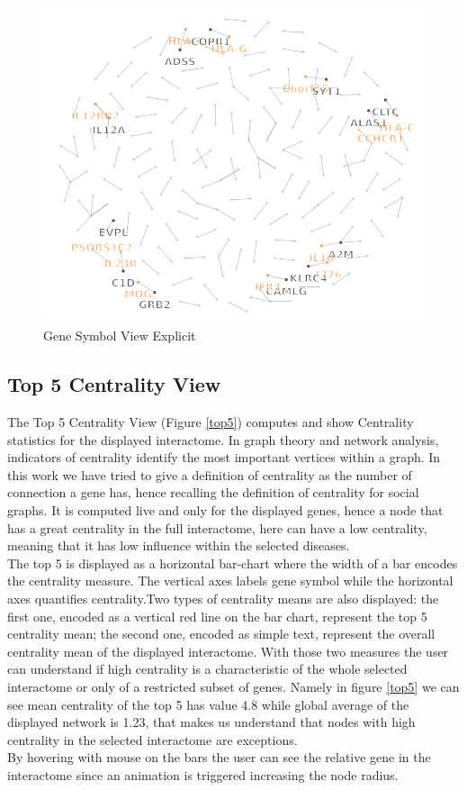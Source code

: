 \documentclass[12pt,twocolumn,twoside]{article}
\begin{document}
\begin{figure}
	\includegraphics[width=.95\linewidth]{net2.png}
	\caption{Gene Symbol View Explicit}
	\label{net2}
\end{figure}


\subsection*{Top 5 Centrality View}
The Top 5 Centrality View (Figure \ref{top5}) computes and show Centrality statistics for the displayed interactome. In graph theory and network analysis, indicators of centrality identify the most important vertices within a graph.  In this work we have tried to give a definition of centrality as the number of connection a gene has, hence recalling the definition of centrality for social graphs. It is computed live and only for the displayed genes, hence a node that has a great centrality in the full interactome, here can have a low centrality, meaning that it has low influence within the selected diseases. \\ The top 5 is displayed as a horizontal bar-chart where the width of a bar encodes the centrality measure. The vertical axes labels gene symbol while the horizontal axes quantifies centrality.\newline Two types of centrality means are also displayed: the first one, encoded as a vertical red line on the bar chart, represent the top 5 centrality mean; the second one, encoded as simple text, represent the overall centrality mean of the displayed interactome. With those two measures the user can understand if high centrality is a characteristic of the whole selected interactome or only of a restricted subset of genes. Namely in figure \ref{top5} we can see mean centrality of the top 5 has value 4.8 while global average of the displayed network is 1.23, that makes us understand that nodes with high centrality in the selected interactome are exceptions.\\ By hovering with mouse on the bars the user can see the relative gene in the interactome since an animation is triggered increasing the node radius.
\end{document}
